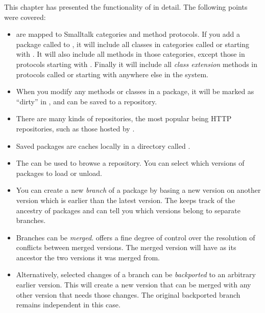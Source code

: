 \documentclass[a4paper,10pt,twoside]{book}
\begin{document}

This chapter has presented the functionality of \MC in detail.
The following points were covered:

\begin{itemize}
\item \MC are mapped to Smalltalk categories and method protocols.
	If you add a package called  to \MC, it will include all classes in categories called  or starting with . It will also include all methods in those categories, except those in protocols starting with \ct{*}. Finally it will include all \emph{class extension} methods in protocols called  or starting with  anywhere else in the system.

\item When you modify any methods or classes in a package, it will be marked as ``dirty'' in \MC, and can be saved to a repository.

\item There are many kinds of repositories, the most popular being HTTP repositories, such as those hosted by \sqsrc.

\item Saved packages are caches locally in a directory called .

\item The \MC \RI can be used to browse a repository. You can select which versions of packages to load or unload.

\item You can create a new \emph{branch} of a package by basing a new version on another version which is earlier than the latest version. The \RI keeps track of the ancestry of packages and can tell you which versions belong to separate branches.

\item Branches can be \emph{merged}. \MC offers a fine degree of control over the resolution of conflicts between merged versions. The merged version will have as its ancestor the two versions it was merged from.

\item Alternatively, selected changes of a branch can be \emph{backported} to an arbitrary earlier version. This will create a new version that can be merged with any other version that needs those changes. The original backported branch remains independent in this case.


\end{itemize}
\end{document}
